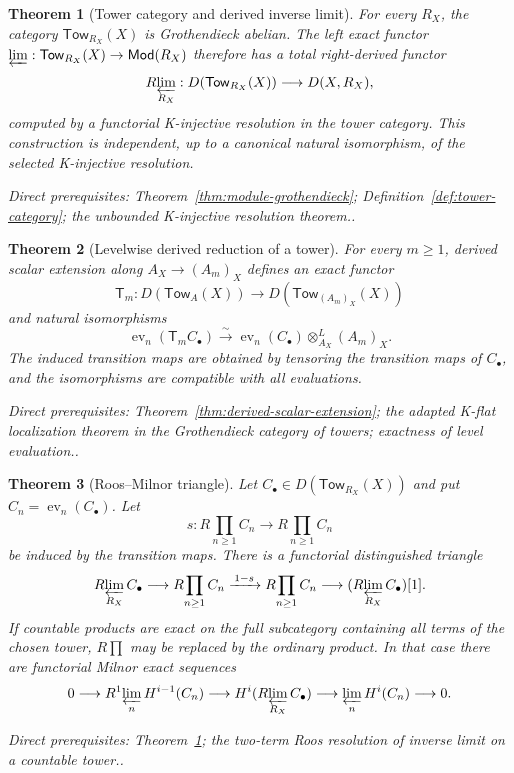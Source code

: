 \documentclass[10pt]{article}
\newtheorem{theorem}{Theorem}[section]
\theoremstyle{definition}
\newcommand{\Rlim}{R\!\varprojlim}
\newcommand{\Rprod}{R\!\prod}
\newcommand{\depends}[1]{\par\smallskip\noindent\textit{Direct prerequisites:} #1.}
\begin{document}
\begin{theorem}[Tower category and derived inverse limit]
\label{thm:derived-limit-existence}
For every $R_X$, the category $\mathsf{Tow}_{R_X}(X)$ is Grothendieck
abelian.  The left exact functor
$\varprojlim:\mathsf{Tow}_{R_X}(X)\to\mathsf{Mod}(R_X)$ therefore has a
total right-derived functor
\[
 \Rlim_{R_X}:D(\mathsf{Tow}_{R_X}(X))\longrightarrow D(X,R_X),
\]
computed by a functorial K-injective resolution in the tower category.
This construction is independent, up to a canonical natural isomorphism,
of the selected K-injective resolution.
\depends{Theorem~\ref{thm:module-grothendieck};
Definition~\ref{def:tower-category}; the unbounded K-injective resolution
theorem.}
\end{theorem}

\begin{theorem}[Levelwise derived reduction of a tower]
\label{thm:tower-reduction}
For every $m\geq1$, derived scalar extension along
$A_X\to(A_m)_X$ defines an exact functor
\[
 \mathsf T_m:D(\mathsf{Tow}_A(X))\longrightarrow
 D(\mathsf{Tow}_{(A_m)_X}(X))
\]
and natural isomorphisms
\[
 \operatorname{ev}_n(\mathsf T_mC_\bullet)
 \xrightarrow{\sim}
 \operatorname{ev}_n(C_\bullet)\otimes^L_{A_X}(A_m)_X.
\]
The induced transition maps are obtained by tensoring the transition maps
of $C_\bullet$, and the isomorphisms are compatible with all evaluations.
\depends{Theorem~\ref{thm:derived-scalar-extension}; the adapted K-flat
localization theorem in the Grothendieck category of towers; exactness of
level evaluation.}
\end{theorem}

\begin{theorem}[Roos--Milnor triangle]\label{thm:milnor-triangle}
Let $C_\bullet\in D(\mathsf{Tow}_{R_X}(X))$ and put
$C_n=\operatorname{ev}_n(C_\bullet)$.  Let
\[
 s:\Rprod_{n\geq1}C_n\longrightarrow\Rprod_{n\geq1}C_n
\]
be induced by the transition maps.  There is a functorial distinguished
triangle
\[
 \Rlim_{R_X} C_\bullet\longrightarrow\Rprod_{n\geq1}C_n
 \xrightarrow{\,1-s\,}\Rprod_{n\geq1}C_n
 \longrightarrow(\Rlim_{R_X}C_\bullet)[1].
\]
If countable products are exact on the full subcategory containing all
terms of the chosen tower, $\Rprod$ may be replaced by the ordinary product.
In that case there are functorial Milnor exact sequences
\[
 0\longrightarrow R^1\!\varprojlim_n H^{i-1}(C_n)
 \longrightarrow H^i(\Rlim_{R_X}C_\bullet)
 \longrightarrow\varprojlim_nH^i(C_n)\longrightarrow0.
\]
\depends{Theorem~\ref{thm:derived-limit-existence}; the two-term Roos
resolution of inverse limit on a countable tower.}
\end{theorem}
\end{document}
